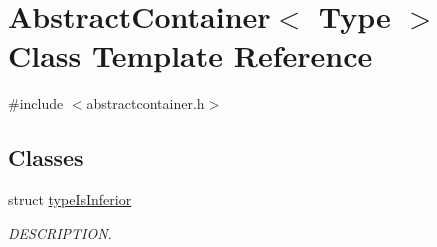 \hypertarget{class_abstract_container}{}\section{Abstract\+Container$<$ Type $>$ Class Template Reference}
\label{class_abstract_container}


{\ttfamily \#include $<$abstractcontainer.\+h$>$}

\subsection*{Classes}
\begin{DoxyCompactItemize}
\item 
struct \hyperlink{struct_abstract_container_1_1type_is_inferior}{type\+Is\+Inferior}
\begin{DoxyCompactList}\small\item\em D\+E\+S\+C\+R\+I\+P\+T\+I\+O\+N. \end{DoxyCompactList}\end{DoxyCompactItemize}
